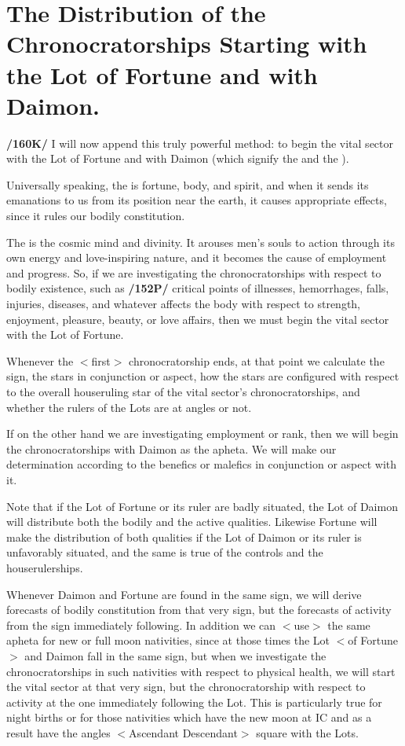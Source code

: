 \section{The Distribution of the Chronocratorships Starting with the Lot of Fortune and with Daimon.}

\textbf{/160K/} I will now append this truly powerful method: to begin the vital sector with the Lot of Fortune and with Daimon (which signify the \Moon\xspace and the \Sun).

Universally speaking, the \Moon\xspace is fortune, body, and
spirit, and when it sends its emanations to us from its position near the earth, it causes appropriate effects, since it rules our bodily constitution. 

The \Sun\xspace is the cosmic mind and divinity. It arouses men’s souls to action through its own energy and love-inspiring nature, and it becomes the cause of employment and progress.
So, if we are investigating the chronocratorships with respect to bodily existence, such as \textbf{/152P/} critical points of illnesses, hemorrhages, falls, injuries, diseases, and whatever affects the body with respect to strength, enjoyment, pleasure, beauty, or love affairs, then we must begin the vital sector with the Lot of Fortune. 

Whenever the $<$first$>$ chronocratorship ends, at that point we calculate the sign, the stars in conjunction or aspect, how the stars are configured with respect to the overall houseruling star of the vital sector’s chronocratorships, and whether the rulers of the Lots are at angles or not.

If on the other hand we are investigating employment or rank, then we will begin the chronocratorships with Daimon as the apheta. We will make our determination according to the benefics or malefics in conjunction or aspect with it.

Note that if the Lot of Fortune or its ruler are badly situated, the Lot of Daimon will distribute both the bodily and the active qualities. Likewise Fortune will make the distribution of both qualities if the Lot of Daimon or its ruler is unfavorably situated, and the same is true of the controls and the houserulerships.

Whenever Daimon and Fortune are found in the same sign, we will derive forecasts of bodily constitution from that very sign, but the forecasts of activity from the sign immediately following. In addition we can $<$use$>$ the same apheta for new or full moon nativities, since at those times the Lot $<$of
Fortune$>$ and Daimon fall in the same sign, but when we investigate the chronocratorships in such nativities with respect to physical health, we will start the vital sector at that very sign, but the chronocratorship with respect to activity at the one immediately following the Lot. This is particularly true for night births or for those nativities which have the new moon at IC and as a result have the angles
$<$Ascendant Descendant$>$ square with the Lots. 

